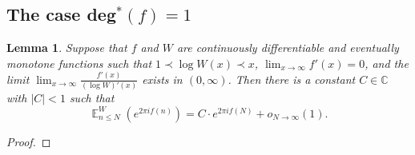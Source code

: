 \documentclass[12pt]{article}
\theoremstyle{plain} %
\newtheorem{lemma}[theorem]{Lemma}
\theoremstyle{definition} %
\theoremstyle{plain}
\theoremstyle{plain}
\numberwithin{equation}{section}
\newcommand{\C}{\mathbb{C}}
\renewcommand{\leq}{\leqslant}
\newcommand{\1}{\mathbbm{1}}
\newcommand{\E}{\operatorname{\mathbb{E}}}
\newcommand{\oo}{\infty}
\begin{document}
\subsection{The case deg\texorpdfstring{$^*(f)=1$}{*(f)=1}}\label{section:d=1}
\begin{lemma}\label{lem:deg=1}
    Suppose that $f$ and $W$ are continuously differentiable and eventually monotone functions such that $1\prec \log W(x)\prec x$, $\lim_{x\to\oo}f'(x)=0$, and the limit $\lim_{x\to\oo}\frac{f'(x)}{(\log W)' (x)}$ exists in $(0,\oo)$. Then there is a constant $C\in \C$ with $|C|<1$ such that 
    \begin{equation}
        \E_{n\leq N}^W(e^{2\pi i f(n)}) = C\cdot e^{2\pi i f(N)}+o_{N\to\oo}(1).
    \end{equation}
\end{lemma}
\begin{proof}


\end{proof}
\end{document}
